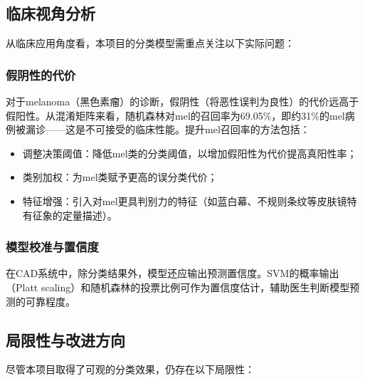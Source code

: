 \documentclass[UTF8,a4paper,12pt]{ctexart}
\numberwithin{figure}{section}
\numberwithin{table}{section}
\begin{document}
\subsection{临床视角分析}

从临床应用角度看，本项目的分类模型需重点关注以下实际问题：

\subsubsection{假阴性的代价}

对于melanoma（黑色素瘤）的诊断，假阴性（将恶性误判为良性）的代价远高于假阳性。从混淆矩阵来看，随机森林对mel的召回率为69.05\%，即约31\%的mel病例被漏诊——这是不可接受的临床性能。提升mel召回率的方法包括：
\begin{itemize}
    \item 调整决策阈值：降低mel类的分类阈值，以增加假阳性为代价提高真阳性率；
    \item 类别加权：为mel类赋予更高的误分类代价；
    \item 特征增强：引入对mel更具判别力的特征（如蓝白幕、不规则条纹等皮肤镜特有征象的定量描述）。
\end{itemize}

\subsubsection{模型校准与置信度}

在CAD系统中，除分类结果外，模型还应输出预测置信度。SVM的概率输出（Platt scaling）和随机森林的投票比例可作为置信度估计，辅助医生判断模型预测的可靠程度。

\subsection{局限性与改进方向}

尽管本项目取得了可观的分类效果，仍存在以下局限性：
\end{document}
